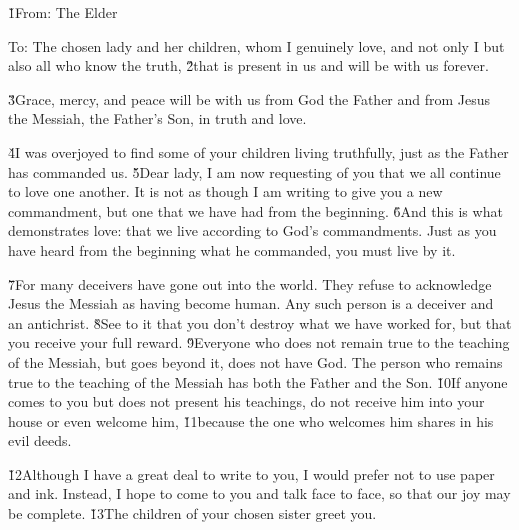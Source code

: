 


\v{1}From: The Elder

To: The chosen lady and her children, whom I genuinely love, and not only I but also all who know the truth, \v{2}that is present in us and will be with us forever.

\v{3}Grace, mercy, and peace will be with us from God the Father and from Jesus the Messiah, the Father's Son, in truth and love.

\v{4}I was overjoyed to find some of your children living truthfully, just as the Father has commanded us. \v{5}Dear lady, I am now requesting of you that we all continue to love one another. It is not as though I am writing to give you a new commandment, but one that we have had from the beginning. \v{6}And this is what demonstrates love: that we live according to God's commandments. Just as you have heard from the beginning what he commanded, you must live by it.

\v{7}For many deceivers have gone out into the world. They refuse to acknowledge Jesus the Messiah as having become human. Any such person is a deceiver and an antichrist. \v{8}See to it that you don't destroy what we have worked for, but that you receive your full reward. \v{9}Everyone who does not remain true to the teaching of the Messiah, but goes beyond it, does not have God. The person who remains true to the teaching of the Messiah has both the Father and the Son. \v{10}If anyone comes to you but does not present his teachings, do not receive him into your house or even welcome him, \v{11}because the one who welcomes him shares in his evil deeds.

\v{12}Although I have a great deal to write to you, I would prefer not to use paper and ink. Instead, I hope to come to you and talk face to face, so that our joy may be complete. \v{13}The children of your chosen sister greet you.
